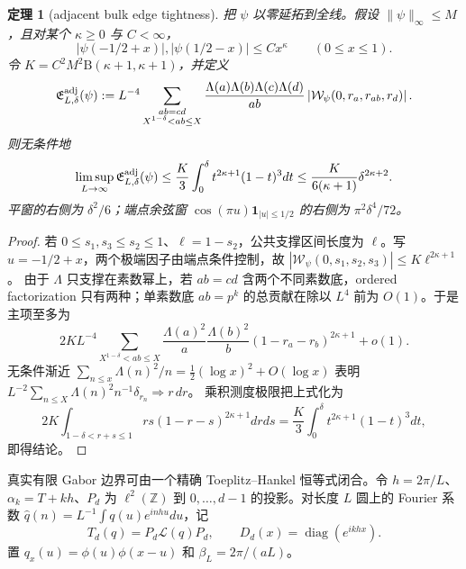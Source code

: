 \documentclass[UTF8,11pt,a4paper]{ctexart}
\newtheorem{theorem}{定理}[section]
\theoremstyle{definition}
\theoremstyle{remark}
\begin{document}
\begin{theorem}[adjacent bulk edge tightness]\label{thm:adjacent-edge}
把 $\psi$ 以零延拓到全线。假设 $\|\psi\|_\infty\le M$，且对某个
$\kappa\ge0$ 与 $C<\infty$，
\[
 |\psi(-1/2+x)|,|\psi(1/2-x)|\le Cx^\kappa\qquad(0\le x\le1).
\]
令 $K=C^2M^2\mathrm B(\kappa+1,\kappa+1)$，并定义
\[
 \mathfrak E_{L,\delta}^{\rm adj}(\psi):=L^{-4}
 \sum_{\substack{ab=cd\\X^{1-\delta}<ab\le X}}
 \frac{\Lambda(a)\Lambda(b)\Lambda(c)\Lambda(d)}{ab}
 \left|\mathcal W_\psi(0,r_a,r_{ab},r_d)\right|.
\]
则无条件地
\[
 \limsup_{L\to\infty}\mathfrak E_{L,\delta}^{\rm adj}(\psi)
 \le \frac K3\int_0^\delta t^{2\kappa+1}(1-t)^3dt
 \le \frac{K}{6(\kappa+1)}\delta^{2\kappa+2}.
 \label{eq:adjacent-edge-rate}
\]
平窗的右侧为 $\delta^2/6$；端点余弦窗
$\cos(\pi u)\mathbf1_{|u|\le1/2}$ 的右侧为
$\pi^2\delta^4/72$。
\end{theorem}

\begin{proof}
若 $0\le s_1,s_3\le s_2\le1$、$\ell=1-s_2$，公共支撑区间长度为
$\ell$。写 $u=-1/2+x$，两个极端因子由端点条件控制，故
$|\mathcal W_\psi(0,s_1,s_2,s_3)|\le K\ell^{2\kappa+1}$。
由于 $\Lambda$ 只支撑在素数幂上，若 $ab=cd$ 含两个不同素数底，ordered
factorization 只有两种；单素数底 $ab=p^k$ 的总贡献在除以 $L^4$ 前为
$O(1)$。于是主项至多为
\[
 2K L^{-4}\sum_{X^{1-\delta}<ab\le X}
 \frac{\Lambda(a)^2}{a}\frac{\Lambda(b)^2}{b}
 (1-r_a-r_b)^{2\kappa+1}+o(1).
\]
无条件渐近
$\sum_{n\le x}\Lambda(n)^2/n=\frac12(\log x)^2+O(\log x)$ 表明
$L^{-2}\sum_{n\le X}\Lambda(n)^2n^{-1}\delta_{r_n}\Rightarrow r\,dr$。
乘积测度极限把上式化为
\[
 2K\int_{1-\delta<r+s\le1}rs(1-r-s)^{2\kappa+1}drds
 =\frac K3\int_0^\delta t^{2\kappa+1}(1-t)^3dt,
\]
即得结论。
\end{proof}

真实有限 Gabor 边界可由一个精确 Toeplitz--Hankel 恒等式闭合。令
$h=2\pi/L$、$\alpha_k=T+kh$、$P_d$ 为 $\ell^2(\mathbb Z)$ 到
$0,\ldots,d-1$ 的投影。对长度 $L$ 圆上的 Fourier 系数
$\widehat q(n)=L^{-1}\int q(u)e^{inhu}du$，记
\[
 T_d(q)=P_d\mathcal L(q)P_d,\qquad
 D_d(x)=\operatorname{diag}(e^{ikhx}).
\]
置 $q_x(u)=\phi(u)\phi(x-u)$ 和
$\beta_L=2\pi/(aL)$。
\end{document}
